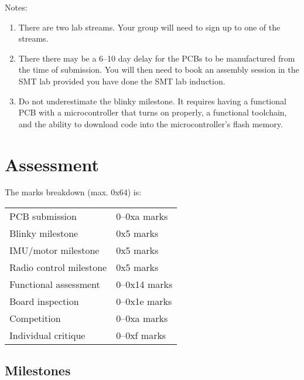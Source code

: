 \documentclass[11pt, a4paper]{article}
\begin{document}
Notes:
%
\begin{enumerate}
\item There are two lab streams.  Your group will need to sign up to
  one of the streams.

\item There there may be a 6--10 day delay for the PCBs to be
  manufactured from the time of submission.  You will then need to
  book an assembly session in the SMT lab provided you have done the
  SMT lab induction.

\item Do not underestimate the blinky milestone.  It requires having a
  functional PCB with a microcontroller that turns on properly, a
  functional toolchain, and the ability to download code into the
  microcontroller's flash memory.

\end{enumerate}


\section{Assessment}

The marks breakdown (max. 0x64) is:
%
\begin{flushleft}
  \begin{tabular}{ll}
    PCB submission & 0--0xa marks\\
    Blinky milestone  & 0x5 marks\\
    IMU/motor milestone  & 0x5 marks\\
    Radio control milestone  & 0x5 marks\\
    Functional assessment & 0--0x14 marks \\
    Board inspection & 0--0x1e marks \\
    Competition & 0--0xa marks \\
    Individual critique & 0--0xf marks \\
  \end{tabular}

\end{flushleft}

\subsection{Milestones}
\end{document}

